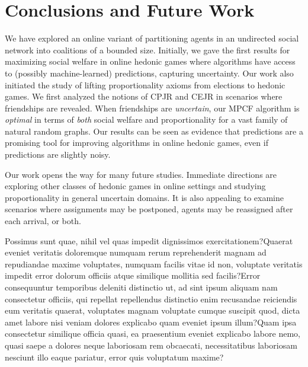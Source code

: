\documentclass[letterpaper]{article}
\begin{document}
\vspace{-0.89mm}
\vspace{-1.96mm}
\section{Conclusions and Future Work}
\label{sec:Conclusions and Future Work}
We have explored an online variant of partitioning agents in an undirected social network into coalitions of a bounded size. Initially, we gave the first results for maximizing social welfare in online hedonic games where algorithms have access to (possibly machine-learned) predictions, capturing uncertainty. Our work also initiated the study of lifting proportionality axioms from elections to hedonic games. We first analyzed the notions of CPJR and CEJR in scenarios where friendships are revealed. When friendships are \textit{uncertain}, our MPCF algorithm is \textit{optimal} in terms of \textit{both} social welfare and proportionality for a vast family of natural random graphs. Our results can be seen as evidence that 
predictions are a promising tool for improving algorithms in online hedonic games, even if predictions are slightly noisy. 

Our work opens the way for many future studies. Immediate directions are exploring other classes of hedonic games in online settings and studying proportionality in general uncertain domains. It is also appealing to examine scenarios where assignments may be postponed, agents may be reassigned after each arrival, or both.


Possimus sunt quae, nihil vel quas impedit dignissimos exercitationem?Quaerat eveniet veritatis doloremque numquam rerum reprehenderit magnam ad repudiandae maxime voluptates, numquam facilis vitae id non, voluptate veritatis impedit error dolorum officiis atque similique mollitia sed facilis?Error consequuntur temporibus deleniti distinctio ut, ad sint ipsum aliquam nam consectetur officiis, qui repellat repellendus distinctio enim recusandae reiciendis eum veritatis quaerat, voluptates magnam voluptate cumque suscipit quod, dicta amet labore nisi veniam dolores explicabo quam eveniet ipsum illum?Quam ipsa consectetur similique officia quasi, ea praesentium eveniet explicabo labore nemo, quasi saepe a dolores neque laboriosam rem obcaecati, necessitatibus laboriosam nesciunt illo eaque pariatur, error quis voluptatum maxime?\clearpage

\end{document}
